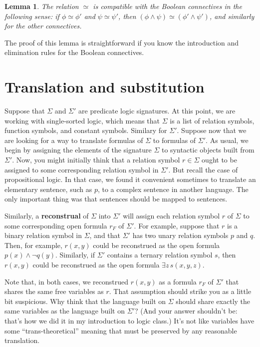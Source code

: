 \documentclass[11pt,fleqn]{article}
\newtheorem{lemma}[prop]{Lemma}
\theoremstyle{definition}
\theoremstyle{remark}
\newcommand{\2}{\mathscr}
\begin{document}
\begin{lemma} The relation $\simeq$ is compatible with the Boolean
  connectives in the following sense: if $\phi\simeq\phi '$ and
  $\psi\simeq \psi '$, then
  $(\phi\wedge \psi )\simeq (\phi '\wedge \psi ')$, and similarly for
  the other connectives. \end{lemma}

The proof of this lemma is straightforward if you know the
introduction and elimination rules for the Boolean connectives.






\section*{Translation and substitution}

Suppose that $\Sigma$ and $\Sigma '$ are predicate logic signatures.
At this point, we are working with single-sorted logic, which means
that $\Sigma$ is a list of relation symbols, function symbols, and
constant symbols.  Similary for $\Sigma '$.  Suppose now that we are
looking for a way to translate formulas of $\Sigma$ to formulas of
$\Sigma '$.  As usual, we begin by assigning the elements of the
signature $\Sigma $ to syntactic objects built from $\Sigma '$.  Now,
you might initially think that a relation symbol $r\in \Sigma$ ought
to be assigned to some corresponding relation symbol in $\Sigma '$.
But recall the case of propositional logic.  In that case, we found it
convenient sometimes to translate an elementary sentence, such as $p$,
to a complex sentence in another language.  The only important thing
was that sentences should be mapped to sentences.

Similarly, a \textbf{reconstrual} of $\Sigma$ into $\Sigma '$ will
assign each relation symbol $r$ of $\Sigma$ to some corresponding open
formula $r_F$ of $\Sigma '$.  For example, suppose that $r$ is a
binary relation symbol in $\Sigma$, and that $\Sigma '$ has two unary
relation symbols $p$ and $q$.  Then, for example, $r(x,y)$ could be
reconstrued as the open formula $p(x)\wedge \neg q(y)$.  Similarly, if
$\Sigma '$ contains a ternary relation symbol $s$, then $r(x,y)$ could
be reconstrued as the open formula $\exists z\,s(x,y,z)$.

Note that, in both cases, we reconstrued $r(x,y)$ as a formula $r_F$
of $\Sigma '$ that shares the same free variables as $r$.  That
assumption should strike you as a little bit suspicious.  Why think
that the language built on $\Sigma $ should share exactly the same
variables as the language built on $\Sigma '$?  (And your answer
shouldn't be: that's how we did it in my introduction to logic class.)
It's not like variables have some ``trans-theoretical'' meaning that
must be preserved by any reasonable translation.
\end{document}
